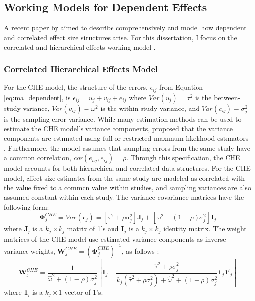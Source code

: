 \subsection{Working Models for Dependent Effects}

A recent paper by \textcite{pustejovsky2022} aimed to describe comprehensively and model how dependent and correlated effect size structures arise. For this dissertation, I focus on the correlated-and-hierarchical effects working model \autocite[CHE;][]{pustejovsky2022}. 

\subsubsection{Correlated Hierarchical Effects Model} 

For the CHE model, the structure of the errors, $\epsilon_{ij}$ from Equation \ref{eq:ma_dependent}, is $\epsilon_{ij} = u_j + v_{ij}+ e_{ij} $ where $Var(u_j) = \tau^2$ is the between-study variance, $Var(v_{ij})= \omega^2$ is the within-study variance, and $Var(e_{ij}) = \sigma^2_j$ is the sampling error variance. While many estimation methods can be used to estimate the CHE model's variance components, \textcite{pustejovsky2022} proposed that the variance components are estimated using full or restricted maximum likelihood estimators \autocite[REML;][]{viechtbauer2005}. Furthermore, the model assumes that sampling errors from the same study have a common correlation, $cor(e_{hj}, e_{ij}) = \rho$. Through this specification, the CHE model accounts for both hierarchical and correlated data structures. For the CHE model, effect size estimates from the same study are modeled as correlated with the value fixed to a common value within studies, and sampling variances are also assumed constant within each study. The variance-covariance matrices have the following form:
\begin{equation}
    \mathbf{\Phi}_j^{CHE} = Var(\mathbf{\epsilon}_j) =[\tau^2 + \rho \sigma^2_j]\mathbf{J}_j +[\omega^2 + (1- \rho)\sigma_j^2]\mathbf{I}_j
\end{equation}
where $\mathbf{J}_j$ is a $k_j \times k_j$ matrix of 1's and $\mathbf{I}_j$ is a $k_j \times k_j$ identity matrix. The weight matrices of the CHE model use estimated variance components as inverse-variance weights, $\mathbf{W}^{CHE}_j = (\mathbf{\Phi}_j^{CHE})^{-1}$, as follows \autocite{tipton2015b}: 
\begin{equation}\label{CHE Weight Matrix}
    \mathbf{W}_j^{CHE} = \frac{1}{\hat{\omega}^2 + (1-\rho)\sigma^2_j} \left[ \mathbf{I}_j - \frac{\hat{\tau}^2+ \rho\sigma^2_j}{k_j(\hat{\tau}^2+\rho\sigma^2_j) + \hat{\omega}^2 + (1-\rho)\sigma^2_j} \mathbf{1}_j \mathbf{1}'_j\right]
\end{equation}
where $\mathbf{1}_j$ is a $k_j \times 1$ vector of 1's.  

